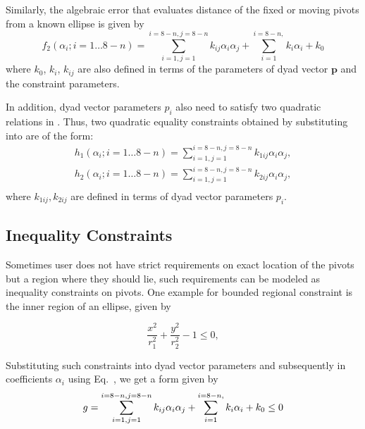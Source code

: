 Similarly, the algebraic error that evaluates distance of the fixed or moving pivots from a known ellipse is given by
\begin{equation}\label{ellipseError}
f_2(\alpha_i;i=1 \ldots 8-n) = \sum_{i=1,j=1}^{i=8-n, j=8-n}k_{ij}\alpha_i\alpha_j +  \sum_{i=1}^{i=8-n,}k_{i}\alpha_i + k_0
\end{equation}
where $k_0$, $k_i$, $k_{ij}$ are also defined in terms of the parameters of dyad vector $\textbf{p}$ and the  constraint parameters.

In addition, dyad vector parameters $p_i$ also need to satisfy two quadratic relations in . Thus, two quadratic equality constraints obtained by substituting 
 into  are of the form:
\begin{equation}\label{h1h2}
\begin{array}{c}
 h_1(\alpha_i;i=1 \ldots 8-n) = \sum_{i=1,j=1}^{i=8-n, j=8-n}k_{1ij}\alpha_i\alpha_j, \\
[0.25cm]
h_2(\alpha_i;i=1 \ldots 8-n) =  \sum_{i=1,j=1}^{i=8-n, j=8-n}k_{2ij}\alpha_i\alpha_j, \\
\end{array}
\end{equation}
where $k_{1ij}, k_{2ij}$ are defined in terms of dyad vector parameters $p_i$.

\subsection{Inequality Constraints}
Sometimes user does not have strict requirements on exact location of the pivots but a region where they should lie, such requirements can be modeled as inequality constraints on pivots. One example for bounded regional constraint is the inner region of an ellipse, given by

      \begin{equation}\label{ellipseIneq}
        \frac{x^2}{r_1^2} + \frac{y^2}{r_2^2} -1 \leq 0,
      \end{equation}

Substituting such constraints into dyad vector parameters and subsequently in coefficients $\alpha_i$ using Eq.~, we get a form given by
\begin{equation}\label{g}
 g =  \sum_{i=1,j=1}^{i=8-n, j=8-n}k_{ij}\alpha_i\alpha_j +  \sum_{i=1}^{i=8-n,}k_{i}\alpha_i + k_0 \leq 0 \\
\end{equation}

